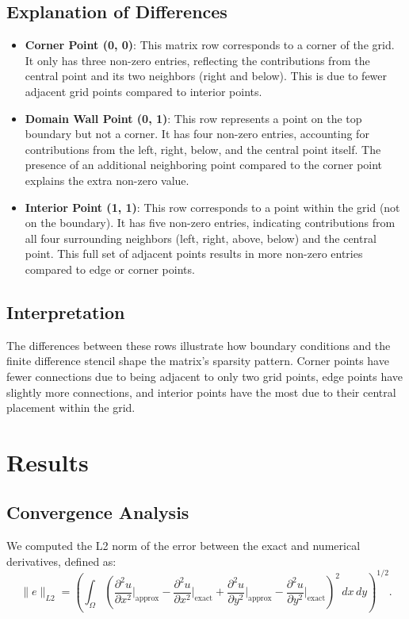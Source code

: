 \documentclass[12pt]{article}
\begin{document}
\subsection{Explanation of Differences}
\begin{itemize}
    \item \textbf{Corner Point (0, 0)}: This matrix row corresponds to a corner of the grid. It only has three non-zero entries, reflecting the contributions from the central point and its two neighbors (right and below). This is due to fewer adjacent grid points compared to interior points.
    \item \textbf{Domain Wall Point (0, 1)}: This row represents a point on the top boundary but not a corner. It has four non-zero entries, accounting for contributions from the left, right, below, and the central point itself. The presence of an additional neighboring point compared to the corner point explains the extra non-zero value.
    \item \textbf{Interior Point (1, 1)}: This row corresponds to a point within the grid (not on the boundary). It has five non-zero entries, indicating contributions from all four surrounding neighbors (left, right, above, below) and the central point. This full set of adjacent points results in more non-zero entries compared to edge or corner points.
\end{itemize}

\subsection{Interpretation}
The differences between these rows illustrate how boundary conditions and the finite difference stencil shape the matrix's sparsity pattern. Corner points have fewer connections due to being adjacent to only two grid points, edge points have slightly more connections, and interior points have the most due to their central placement within the grid.


\section{Results}
\subsection{Convergence Analysis}
We computed the L2 norm of the error between the exact and numerical derivatives, defined as:
\[
\|e\|_{L2} = \left( \int_{\Omega} \left(\frac{\partial^2 u}{\partial x^2} \Big|_{\text{approx}} - \frac{\partial^2 u}{\partial x^2} \Big|_{\text{exact}} + \frac{\partial^2 u}{\partial y^2} \Big|_{\text{approx}} - \frac{\partial^2 u}{\partial y^2} \Big|_{\text{exact}} \right)^2 \, dx \, dy \right)^{1/2}.
\]
\end{document}
